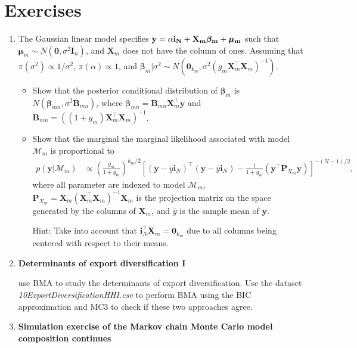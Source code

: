 \section{Exercises}\label{sec10_8}

\begin{enumerate}
	\item The Gaussian linear model specifies $\bf{y}=\alpha\bm{i}_N+\bm{X}_m\bm{\beta}_m+\bm{\mu}_m$ such that $\bm{\mu}_m\sim{N}(\bm{0},\sigma^2\bm{I}_n)$, and $\bm{X}_m$ does not have the column of ones. Assuming that $\pi(\sigma^2)\propto 1/{\sigma^2}$, $\pi(\alpha)\propto 1$, and $\bm{\beta}_m|\sigma^2 \sim {N}(\bm{0}_{k_m}, \sigma^2 (g_m\bm{X}_m^{\top}\bm{X}_m)^{-1})$.
	\begin{itemize}
		\item Show that the posterior conditional distribution of $\bm{\beta}_m$ is $N(\bm{\beta}_{mn},\sigma^2\bm{B}_{mn})$, where $\bm{\beta}_{mn}=\bm{B}_{mn}\bm{X}_m^{\top}\bm{y}$ and $\bm{B}_{mn}=((1+g_m)\bm{X}_m^{\top}\bm{X}_m)^{-1}$.
		\item Show that the marginal the marginal likelihood associated with model $\mathcal{M}_m$ is proportional to
		\begin{align*}
			p(\bm{y}|\mathcal{M}_m)&\propto \left(\frac{g_m}{1+g_m}\right)^{k_m/2} \left[(\bm{y}-\bar{y}\bm{i}_N)^{\top}(\bm{y}-\bar{y}\bm{i}_N)-\frac{1}{1+g_m}(\bm{y}^{\top}\bm{P}_{X_m}\bm{y})\right]^{-(N-1)/2},
		\end{align*}
		where all parameter are indexed to model $\mathcal{M}_m$, $\bm{P}_{X_m}=\bm{X}_m(\bm{X}_m^{\top}\bm{X}_m)^{-1}\bm{X}_m$ is the projection matrix on the space generated by the columns of $\bm{X}_m$, and $\bar{y}$ is the sample mean of $\bm{y}$.
		
		Hint: Take into account that $\bm{i}_N^{\top}\bm{X}_m=\bm{0}_{k_m}$ due to all columns being centered with respect to their means.
	\end{itemize}

\item \textbf{Determinants of export diversification I}

\cite{Jetter2015} use BMA to study the determinants of export diversification. Use the dataset \textit{10ExportDiversificationHHI.csv} to perform BMA using the BIC approximation and MC3 to check if these two approaches agree. 

\item \textbf{Simulation exercise of the Markov chain Monte Carlo model composition continues}


\end{enumerate}
